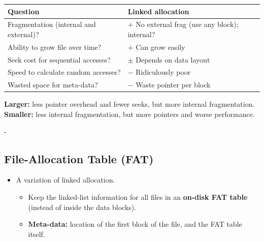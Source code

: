 \documentclass[11pt,a4paper]{article}
\makeatletter
\newcommand{\keepspace}[1]{\par\penalty-100\begingroup
  \setlength{\dimen@}{#1}\dimen@ii\pagegoal\advance\dimen@ii-\pagetotal
  \ifdim\dimen@>\dimen@ii\ifdim\dimen@ii>\z@\vfil\fi\break\fi\endgroup}
\makeatother
\begin{document}
\begin{center}
\renewcommand{\arraystretch}{1.2}
\begin{tabularx}{\textwidth}{@{}lX@{}}
  \toprule
  \textbf{Question} & \textbf{Linked allocation} \\
  \midrule
  Fragmentation (internal and external)? & $+$ No external frag (use any block); internal? \\
  Ability to grow file over time? & $+$ Can grow easily \\
  Seek cost for sequential accesses? & $\pm$ Depends on data layout \\
  Speed to calculate random accesses? & $-$ Ridiculously poor \\
  Wasted space for meta-data? & $-$ Waste pointer per block \\
  \bottomrule
\end{tabularx}
\end{center}


\begin{quizbox}
\textbf{Larger:} less pointer overhead and fewer seeks, but more internal
fragmentation. \textbf{Smaller:} less internal fragmentation, but more
pointers and worse performance.
\end{quizbox}

\keepspace{8\baselineskip}
\subsection{File-Allocation Table (FAT)}

\begin{itemize}
  \item A variation of linked allocation.
  \begin{itemize}
    \item Keep the linked-list information for all files in an
          \textbf{on-disk FAT table} (instead of inside the data blocks).
    \item \textbf{Meta-data:} location of the first block of the file, and
          the FAT table itself.
  \end{itemize}
\end{itemize}
\end{document}
